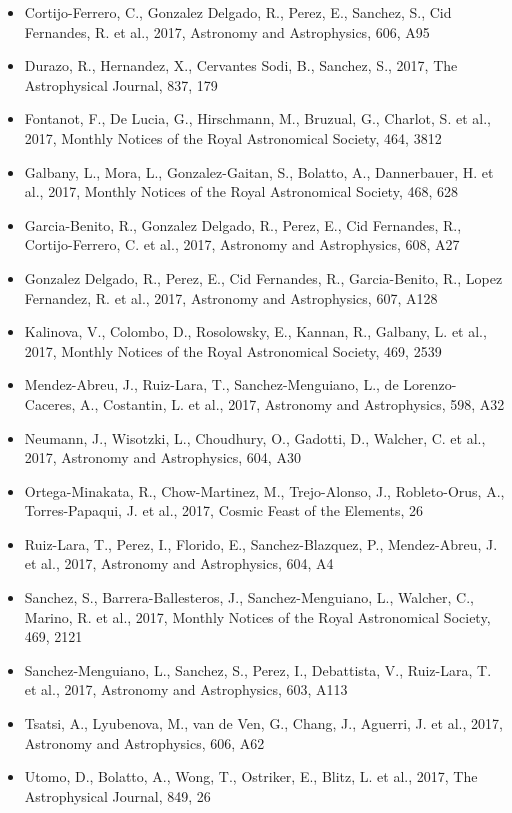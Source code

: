 \documentclass{letter}
\begin{document}
\begin{enumerate}
\begin{itemize}
\item Cortijo-Ferrero, C., Gonzalez Delgado, R., Perez, E., Sanchez, S., Cid Fernandes, R. et al., 2017, Astronomy and Astrophysics, 606, A95
\item Durazo, R., Hernandez, X., Cervantes Sodi, B., Sanchez, S., 2017, The Astrophysical Journal, 837, 179
\item Fontanot, F., De Lucia, G., Hirschmann, M., Bruzual, G., Charlot, S. et al., 2017, Monthly Notices of the Royal Astronomical Society, 464, 3812
\item Galbany, L., Mora, L., Gonzalez-Gaitan, S., Bolatto, A., Dannerbauer, H. et al., 2017, Monthly Notices of the Royal Astronomical Society, 468, 628
\item Garcia-Benito, R., Gonzalez Delgado, R., Perez, E., Cid Fernandes, R., Cortijo-Ferrero, C. et al., 2017, Astronomy and Astrophysics, 608, A27
\item Gonzalez Delgado, R., Perez, E., Cid Fernandes, R., Garcia-Benito, R., Lopez Fernandez, R. et al., 2017, Astronomy and Astrophysics, 607, A128
\item Kalinova, V., Colombo, D., Rosolowsky, E., Kannan, R., Galbany, L. et al., 2017, Monthly Notices of the Royal Astronomical Society, 469, 2539
\item Mendez-Abreu, J., Ruiz-Lara, T., Sanchez-Menguiano, L., de Lorenzo-Caceres, A., Costantin, L. et al., 2017, Astronomy and Astrophysics, 598, A32
\item Neumann, J., Wisotzki, L., Choudhury, O., Gadotti, D., Walcher, C. et al., 2017, Astronomy and Astrophysics, 604, A30
\item Ortega-Minakata, R., Chow-Martinez, M., Trejo-Alonso, J., Robleto-Orus, A., Torres-Papaqui, J. et al., 2017, Cosmic Feast of the Elements, 26
\item Ruiz-Lara, T., Perez, I., Florido, E., Sanchez-Blazquez, P., Mendez-Abreu, J. et al., 2017, Astronomy and Astrophysics, 604, A4
\item Sanchez, S., Barrera-Ballesteros, J., Sanchez-Menguiano, L., Walcher, C., Marino, R. et al., 2017, Monthly Notices of the Royal Astronomical Society, 469, 2121
\item Sanchez-Menguiano, L., Sanchez, S., Perez, I., Debattista, V., Ruiz-Lara, T. et al., 2017, Astronomy and Astrophysics, 603, A113
\item Tsatsi, A., Lyubenova, M., van de Ven, G., Chang, J., Aguerri, J. et al., 2017, Astronomy and Astrophysics, 606, A62
\item Utomo, D., Bolatto, A., Wong, T., Ostriker, E., Blitz, L. et al., 2017, The Astrophysical Journal, 849, 26

\end{itemize}
\end{enumerate}
\end{document}
